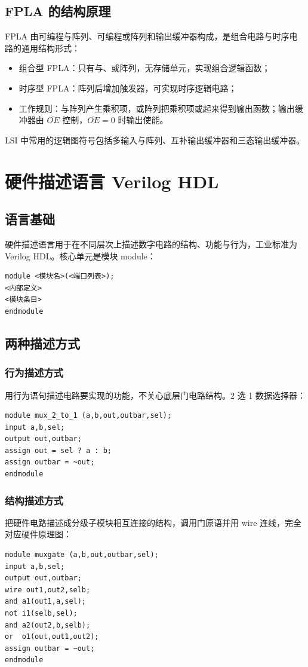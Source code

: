 \subsection{FPLA 的结构原理}
FPLA 由可编程与阵列、可编程或阵列和输出缓冲器构成，是组合电路与时序电路的通用结构形式：
\begin{itemize}
    \item 组合型 FPLA：只有与、或阵列，无存储单元，实现组合逻辑函数；
    \item 时序型 FPLA：阵列后增加触发器，可实现时序逻辑电路；
    \item 工作规则：与阵列产生乘积项，或阵列把乘积项或起来得到输出函数；输出缓冲器由 \(\overline{OE}\) 控制，\(\overline{OE}=0\) 时输出使能。
\end{itemize}
LSI 中常用的逻辑图符号包括多输入与阵列、互补输出缓冲器和三态输出缓冲器。

\section{硬件描述语言 Verilog HDL}
\subsection{语言基础}
硬件描述语言用于在不同层次上描述数字电路的结构、功能与行为，工业标准为 Verilog HDL。核心单元是模块 module：
\begin{verbatim}
module <模块名>(<端口列表>);
<内部定义>
<模块条目>
endmodule
\end{verbatim}

\subsection{两种描述方式}
\subsubsection{行为描述方式}
用行为语句描述电路要实现的功能，不关心底层门电路结构。2 选 1 数据选择器：
\begin{verbatim}
module mux_2_to_1 (a,b,out,outbar,sel);
input a,b,sel;
output out,outbar;
assign out = sel ? a : b;
assign outbar = ~out;
endmodule
\end{verbatim}

\subsubsection{结构描述方式}
把硬件电路描述成分级子模块相互连接的结构，调用门原语并用 wire 连线，完全对应硬件原理图：
\begin{verbatim}
module muxgate (a,b,out,outbar,sel);
input a,b,sel;
output out,outbar;
wire out1,out2,selb;
and a1(out1,a,sel);
not i1(selb,sel);
and a2(out2,b,selb);
or  o1(out,out1,out2);
assign outbar = ~out;
endmodule
\end{verbatim}

